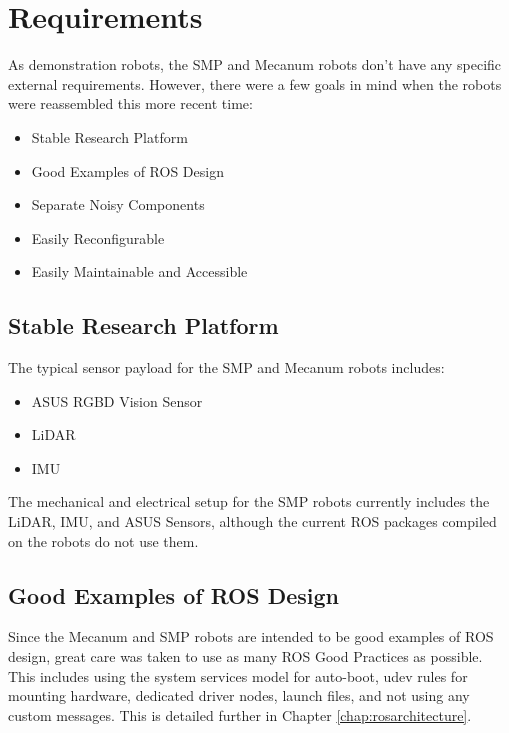 
\chapter{Requirements}
\label{chap:requirements}

As demonstration robots, the SMP and Mecanum robots don't have any specific external requirements. However, there were a few goals in mind when the robots were reassembled this more recent time:

\begin{itemize}
  \item{Stable Research Platform}
  \item{Good Examples of ROS Design}
  \item{Separate Noisy Components}
  \item{Easily Reconfigurable}
  \item{Easily Maintainable and Accessible}
\end{itemize}

\section{Stable Research Platform}

The typical sensor payload for the SMP and Mecanum robots includes:

\begin{itemize}
  \item{ASUS RGBD Vision Sensor}
  \item{LiDAR}
  \item{IMU}
\end{itemize}

The mechanical and electrical setup for the SMP robots currently includes the LiDAR, IMU, and ASUS Sensors, although the current ROS packages compiled on the robots do not use them.

\section{Good Examples of ROS Design}

Since the Mecanum and SMP robots are intended to be good examples of ROS design, great care was taken to use as many ROS Good Practices as possible. This includes using the system services model for auto-boot, udev rules for mounting hardware, dedicated driver nodes, launch files, and not using any custom messages. This is detailed further in Chapter \ref{chap:rosarchitecture}.

